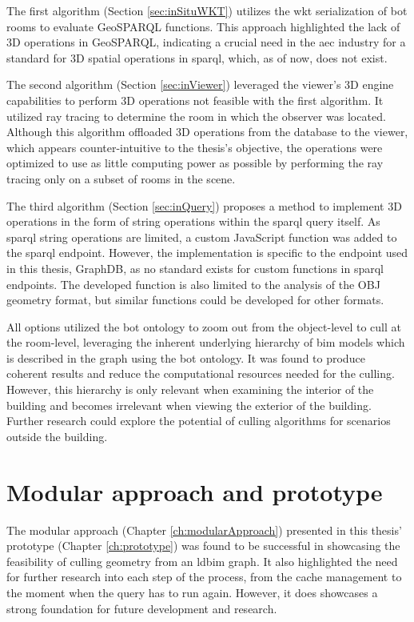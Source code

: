 The first algorithm (Section \ref{sec:inSituWKT}) utilizes the \ac{wkt} serialization of \ac{bot} rooms to evaluate GeoSPARQL functions. This approach highlighted the lack of 3D operations in GeoSPARQL, indicating a crucial need in the \ac{aec} industry for a standard for 3D spatial operations in \ac{sparql}, which, as of now, does not exist.

The second algorithm (Section \ref{sec:inViewer}) leveraged the viewer's 3D engine capabilities to perform 3D operations not feasible with the first algorithm. It utilized ray tracing to determine the room in which the observer was located. Although this algorithm offloaded 3D operations from the database to the viewer, which appears counter-intuitive to the thesis's objective, the operations were optimized to use as little computing power as possible by performing the ray tracing only on a subset of rooms in the scene.

The third algorithm (Section \ref{sec:inQuery}) proposes a method to implement 3D operations in the form of string operations within the \ac{sparql} query itself. As \ac{sparql} string operations are limited, a custom JavaScript function was added to the \ac{sparql} endpoint. However, the implementation is specific to the endpoint used in this thesis, GraphDB, as no standard exists for custom functions in \ac{sparql} endpoints. The developed function is also limited to the analysis of the OBJ geometry format, but similar functions could be developed for other formats.

All options utilized the \ac{bot} ontology to zoom out from the object-level to cull at the room-level, leveraging the inherent underlying hierarchy of \ac{bim} models which is described in the graph using the \ac{bot} ontology. It was found to produce coherent results and reduce the computational resources needed for the culling. However, this hierarchy is only relevant when examining the interior of the building and becomes irrelevant when viewing the exterior of the building. Further research could explore the potential of culling algorithms for scenarios outside the building.

\section{Modular approach and prototype}
The modular approach (Chapter \ref{ch:modularApproach}) presented in this thesis' prototype (Chapter \ref{ch:prototype}) was found to be successful in showcasing the feasibility of culling geometry from an \ac{ldbim} graph. It also highlighted the need for further research into each step of the process, from the cache management to the moment when the query has to run again. However, it does showcases a strong foundation for future development and research.

